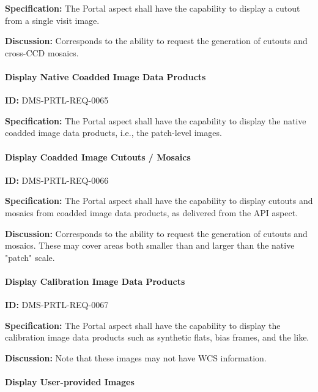 \documentclass[SE,toc,lsstdraft]{lsstdoc}
\begin{document}
\textbf{Specification:}
The Portal aspect shall have the capability to display a cutout from a single visit image.

\textbf{Discussion:}
Corresponds to the ability to request the generation of cutouts and cross-CCD mosaics.

\paragraph{Display Native Coadded Image Data Products}\hfill  %

\label{DMS-PRTL-REQ-0065}
\textbf{ID:} DMS-PRTL-REQ-0065

\textbf{Specification:}
The Portal aspect shall have the capability to display the native coadded image data products, i.e., the patch-level images.

\paragraph{Display Coadded Image Cutouts / Mosaics}\hfill  %

\label{DMS-PRTL-REQ-0066}
\textbf{ID:} DMS-PRTL-REQ-0066

\textbf{Specification:}
The Portal aspect shall have the capability to display cutouts and mosaics from coadded image data products, as delivered from the API aspect.

\textbf{Discussion:}
Corresponds to the ability to request the generation of cutouts and mosaics.  These may cover areas both smaller than and larger than the native "patch" scale.

\paragraph{Display Calibration Image Data Products}\hfill  %

\label{DMS-PRTL-REQ-0067}
\textbf{ID:} DMS-PRTL-REQ-0067

\textbf{Specification:}
The Portal aspect shall have the capability to display the calibration image data products such as synthetic flats, bias frames, and the like.

\textbf{Discussion:}
Note that these images may not have WCS information.

\paragraph{Display User-provided Images}\hfill  %
\end{document}
